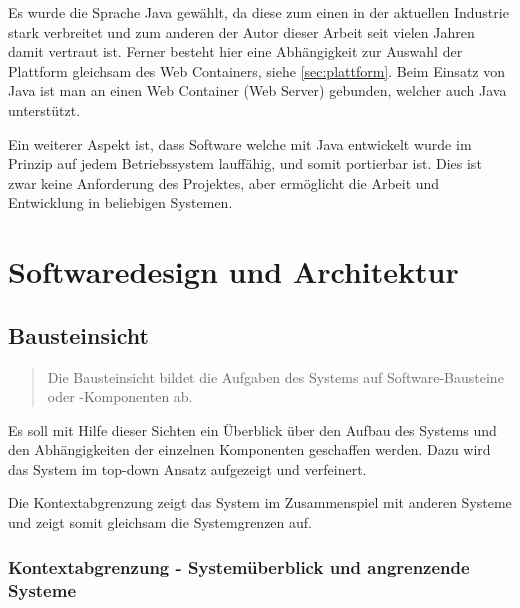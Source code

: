 Es wurde die Sprache Java gewählt, da diese zum einen in der aktuellen Industrie stark verbreitet und zum anderen der Autor dieser Arbeit seit vielen Jahren damit vertraut ist. Ferner besteht hier eine Abhängigkeit zur Auswahl der Plattform gleichsam des Web Containers, siehe \autoref{sec:plattform}. Beim Einsatz von Java ist man an einen Web Container (Web Server) gebunden, welcher auch Java unterstützt. 

Ein weiterer Aspekt ist, dass Software welche mit Java entwickelt wurde im Prinzip auf jedem Betriebssystem lauffähig, und somit portierbar ist. Dies ist zwar keine Anforderung des Projektes, aber ermöglicht die Arbeit und Entwicklung in beliebigen Systemen. 

\section{Softwaredesign und Architektur}

\subsection{Bausteinsicht}
\begin{quotation}
Die Bausteinsicht bildet die Aufgaben des Systems auf Software-Bausteine oder -Komponenten ab.
 \citep[S. 98ff][]{starke}	
\end{quotation}

Es soll mit Hilfe dieser Sichten ein Überblick über den Aufbau des Systems und den Abhängigkeiten der einzelnen Komponenten geschaffen werden. Dazu wird das System im top-down Ansatz aufgezeigt und verfeinert. 

Die Kontextabgrenzung zeigt das System im Zusammenspiel mit anderen Systeme und zeigt somit gleichsam die Systemgrenzen auf. 

\subsubsection{Kontextabgrenzung - Systemüberblick und angrenzende Systeme} 

